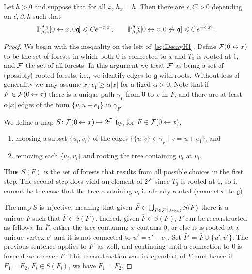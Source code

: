 \documentclass[11pt]{amsart}
\numberwithin{equation}{section}
\numberwithin{theorem}{section}
\newcommand{\ghost}{\mathfrak{g}}
\newcommand{\conn}{\leftrightarrow}
\newcommand{\nconn}{\not\leftrightarrow}
\newcommand{\1}{{\bf 1}}
\begin{document}
\begin{lemma}
  \label{lem:DecayH}
  Let $h>0$ and suppose that for all $x$, $h_x= h$.  Then there are $c,C>0$ depending on $d,\beta,h$ such that
  \begin{equation}
    \label{eq:DecayH1}
    \P^{\Lambda_{N}}_{\beta,h}[0\conn x,0\ghost] \leq Ce^{-c|x|},
    \qquad 
    \P^{\Lambda_{N}}_{\beta,h}[0\conn x,0\nconn \ghost] \leq Ce^{-c|x|}
    .
  \end{equation}
\end{lemma}
\begin{proof}
  We begin with the inequality on the left
  of~\eqref{eq:DecayH1}. Define $\cF(0\conn x)$ to be the set of
  forests in which both $0$ is connected to $x$ 
  and $T_{0}$ is rooted at $0$, and $\mathcal F$ the set of all forests. In
  this argument we treat $\mathcal F$ as being a set of (possibly) rooted
  forests, i.e., we identify edges to $\ghost$ with roots.  Without
  loss of generality 
  we may assume $x\cdot e_{1} \geq \alpha |x|$ for a
  fixed $\alpha>0$. Note that if $F\in \cF(0\conn x)$
  there is a unique path $\gamma_{F}$ from $0$ to $x$ in $F$, and there are
  at least $\alpha |x|$ edges of the form $\{u,u+e_{1}\}$ in $\gamma_{F}$.

  We define a map $S\colon \cF(0\conn x) \to 2^{\cF}$ by, for
  $F\in \cF(0\conn x)$,
  \begin{enumerate}
  \item choosing a subset $\{u_{i},v_{i}\}$ of the edges
    $\{ \{u,v\} \in \gamma_{F} \mid v=u+e_{1}\}$, and
  \item removing each $\{u_{i},v_{i}\}$ and rooting the tree containing
    $v_{i}$ at $v_{i}$.
  \end{enumerate}
  Thus $S(F)$ is the set of forests that results from all possible
  choices in the first step. The second step does yield an element of
  $2^{\mathcal F}$ since $T_{0}$ is rooted at $0$, so it cannot be the case
  that the tree containing $v_{i}$ is already rooted (connected to
  $\ghost$).

  The map $S$ is injective, meaning that given
  $\bar F\in \bigcup_{F\in \cF(0\conn x)}S(F)$ 
  there is a unique $F$ such that $\bar F \in S(F)$.
  Indeed, given
  $\bar F\in S(F)$, $F$ can be 
  reconstructed as follows. In $\bar F$, either the tree containing
  $x$ contains $0$, or else it is
  rooted at a unique vertex $v'$ and it is not connected to $u'=v'-e_{1}$. Set
  $\bar F'=\bar F\cup \{u',v'\}$. The previous sentence applies to
  $\bar F'$ as well, and continuing until a connection to $0$ is
  formed we recover $F$. This reconstruction was independent of
  $F$, and hence if $\bar F_{1}=\bar F_{2}$,
  $\bar F_{i}\in S(F_{i})$, we have $F_{1}=F_{2}$.


\end{proof}
\end{document}

